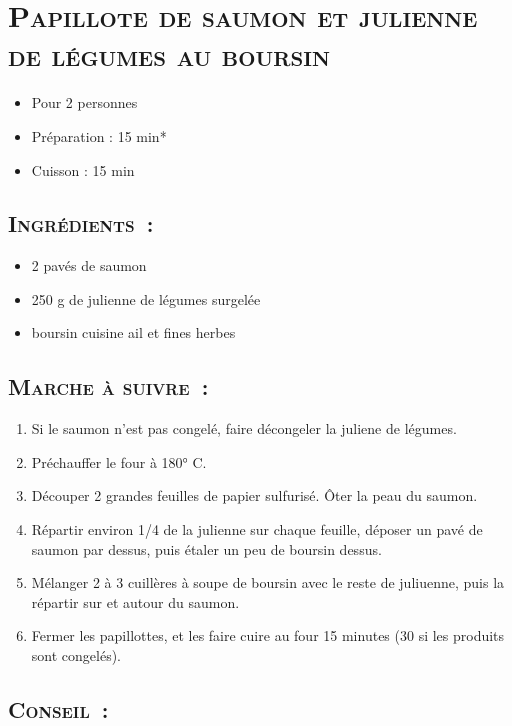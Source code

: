 \section[\normalsize{Papillote de saumon et julienne de l\'egumes au boursin}]{\LARGE{\textsc{Papillote de saumon et julienne de l\'egumes au boursin}}}		%


\begin{itemize}
\item Pour 2 personnes
\item Préparation : 15 min*
\item Cuisson : 15 min
\end{itemize}

\subsection*{\textsc{Ingr\'edients~:}}

\begin{itemize}
\item 2 pav\'es de saumon
\item 250 g de julienne de l\'egumes surgel\'ee
\item boursin cuisine ail et fines herbes
\end{itemize}


\subsection*{\textsc{Marche \`a suivre~:}}

\begin{enumerate}
\item Si le saumon n'est pas congel\'e, faire d\'econgeler la juliene de l\'egumes. 
\item Pr\'echauffer le four \`a 180° C.
\item D\'ecouper 2 grandes feuilles de papier sulfuris\'e. Ôter la peau du saumon. 
\item R\'epartir environ 1/4 de la julienne sur chaque feuille, d\'eposer un pav\'e de saumon par dessus, puis \'etaler un peu de boursin dessus.
\item M\'elanger 2 \`a 3 cuill\`eres \`a soupe de boursin avec le reste de juliuenne, puis la r\'epartir sur et autour du saumon.
\item Fermer les papillottes, et les faire cuire au four 15 minutes (30 si les produits sont congel\'es).
\end{enumerate}
\subsection*{\textsc{Conseil~:}}


